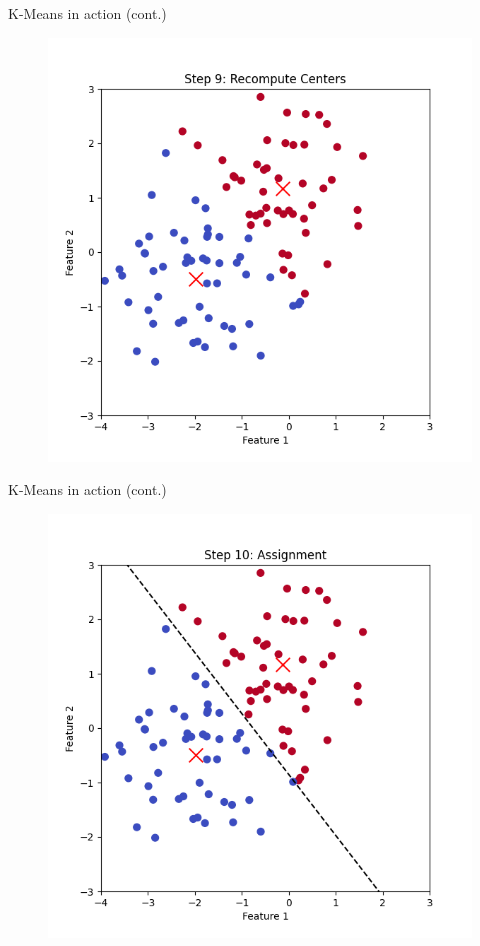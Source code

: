 \documentclass[serif, aspectratio=169]{beamer}
\begin{document}
\begin{frame}{K-Means in action (cont.)}
    \begin{figure}
        \centering
        \includegraphics[scale=0.45]{pic/figs/kmeans_step_9_recompute_centers.png}
    \end{figure}
\end{frame}
\begin{frame}{K-Means in action (cont.)}
    \begin{figure}
        \centering
        \includegraphics[scale=0.45]{pic/figs/kmeans_step_10_assignment.png}
    \end{figure}
\end{frame}
\end{document}
